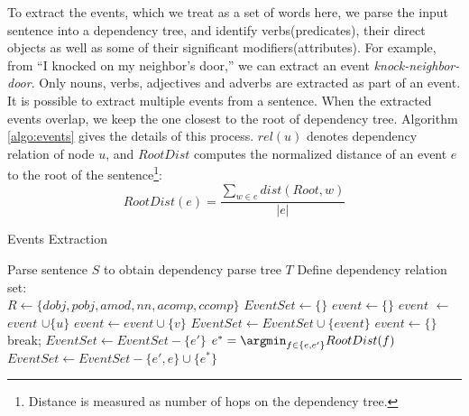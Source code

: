 {To extract the events, which we treat as a set of words here, we
parse the input sentence into a dependency tree, and identify
verbs(predicates), their direct objects as well as
some of their significant modifiers(attributes).
For example, from ``I knocked on my neighbor's door,'' we can
extract an event {\em knock-neighbor-door}. Only nouns, verbs,
adjectives and adverbs are extracted as part of an event. It is
possible to extract multiple events from a sentence.
When the extracted events overlap,
we keep the one closest to the root of dependency tree.
Algorithm \ref{algo:events} gives the details of
this process. $rel(u)$ denotes dependency relation of node $u$,
and $RootDist$ computes the normalized distance of an event $e$ to
the root of the sentence\footnote{Distance is measured as number of hops
on the dependency tree.}:
\begin{equation}
RootDist(e) = \frac{\sum_{w \in e} dist(Root, w)}{|e|}
\end{equation}
%
\begin{algorithm}[th]
\caption{Events Extraction}
\label{algo:events}
\begin{algorithmic}[1]
\begin{small}
\State Parse sentence $S$ to obtain dependency parse tree $T$
\State Define dependency relation set: \\
\quad \quad $R \leftarrow \{dobj, pobj, amod, nn, acomp, ccomp\}$
\State $EventSet \leftarrow \{\}$
\State $event \leftarrow \{\}$
\State $event$ $\leftarrow$ $event$ $\cup \{u\}$
\State $event \leftarrow event \cup \{v\}$
\State $EventSet \leftarrow EventSet \cup \{event\}$
\State $event \leftarrow \{\}$
\State break;
\EndIf
\EndWhile
\EndFor
{}
\State $EventSet \leftarrow EventSet -\{e'\}$
\EndIf
{}
\State $e^{*} = \argmin_{f \in \{e, e'\}} RootDist(f)$
\State $EventSet \leftarrow EventSet - \{e', e\} \cup \{e^{*}\}$
\EndIf
\EndFor
\end{small}
\end{algorithmic}
\end{algorithm}

}
